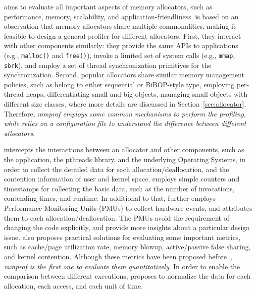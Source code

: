 \MP{} aims to evaluate all important aspects of memory allocators, such as performance, memory, scalability, and application-friendliness. \MP{} is based on an observation that memory allocators share multiple commonalities, making it feasible to design a general profiler for different allocators. First, they interact with other components similarly: they provide the same APIs to applications (e.g., \texttt{malloc()} and \texttt{free()}), invoke a limited set of system calls (e.g., \texttt{mmap}, \texttt{sbrk}), and employ a set of thread synchronization primitives for the synchronization. Second, popular allocators share similar memory management policies, such as belong to either sequential or BiBOP-style type, employing per-thread heaps, differentiating small and big objects, managing small objects with different size classes, where more details are discussed in Section~\ref{sec:allocator}. Therefore, \textit{mmprof employs some common mechanisms to perform the profiling, while relies on a configuration file to understand the difference between different allocators}.    

\MP{} intercepts the interactions between an allocator and other components, such as the application, the pthreads library, and the underlying Operating Systems, in order to collect the detailed data for each allocation/deallocation, and the contention information of user and kernel space. 
 \MP{} employs simple counters and timestamps for collecting the basic data, such as the number of invocations, contending times, and runtime. In additional to that, \MP{} further employs Performance Monitoring Units (PMUs) to collect hardware events, and attributes them to each allocation/deallocation. The PMUs avoid the requirement of changing the code explicitly, and provide more insights about  a particular design issue. \MP{} also proposes practical solutions for evaluating some important metrics, such as cache/page utilization rate, memory blowup, active/passive false sharing, and kernel contention. Although these metrics have been proposed before~\cite{Hoard}, \textit{mmprof is the first one to evaluate them quantitatively}. In order to enable the comparison between different executions, \MP{} proposes to normalize the  data for each allocation, each access, and each unit of time.  


